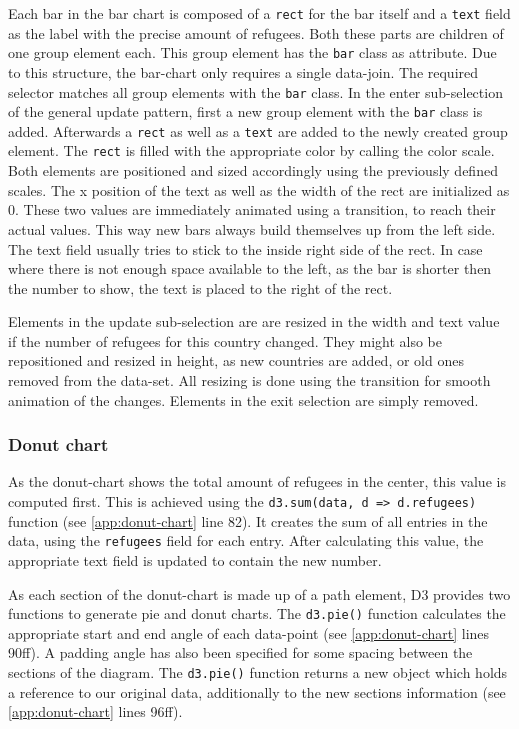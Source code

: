 Each bar in the bar chart is composed of a \texttt{rect} for the bar itself and a \texttt{text} field as the label with the precise amount of refugees. Both these parts are children of one group element each. This group element has the \texttt{bar} class as attribute. Due to this structure, the bar-chart only requires a single data-join. The required selector matches all group elements with the \texttt{bar} class. In the enter sub-selection of the general update pattern, first a new group element with the \texttt{bar} class is added. Afterwards a \texttt{rect} as well as a \texttt{text} are added to the newly created group element. The \texttt{rect} is filled with the appropriate color by calling the color scale. Both elements are positioned and sized accordingly using the previously defined scales. The x position of the text as well as the width of the rect are initialized as 0. These two values are immediately animated using a transition, to reach their actual values. This way new bars always build themselves up from the left side. The text field usually tries to stick to the inside right side of the rect. In case where there is not enough space available to the left, as the bar is shorter then the number to show, the text is placed to the right of the rect.

Elements in the update sub-selection are are resized in the width and text value if the number of refugees for this country changed. They might also be repositioned and resized in height, as new countries are added, or old ones removed from the data-set. All resizing is done using the transition for smooth animation of the changes. Elements in the exit selection are simply removed.

\subsubsection{Donut chart}

As the donut-chart shows the total amount of refugees in the center, this value is computed first. This is achieved using the \texttt{d3.sum(data, d => d.refugees)} function (see \ref{app:donut-chart} line 82). It creates the sum of all entries in the data, using the \texttt{refugees} field for each entry. After calculating this value, the appropriate text field is updated to contain the new number.

As each section of the donut-chart is made up of a path element, D3 provides two functions to generate pie and donut charts. The \texttt{d3.pie()} function calculates the appropriate start and end angle of each data-point (see \ref{app:donut-chart} lines 90ff). A padding angle has also been specified for some spacing between the sections of the diagram. The \texttt{d3.pie()} function returns a new object which holds a reference to our original data, additionally to the new sections information (see \ref{app:donut-chart} lines 96ff). 

